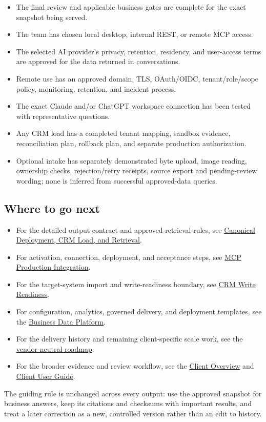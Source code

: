 \documentclass[
]{article}
\newcounter{none} %
\providecommand{\tightlist}{%
  \setlength{\itemsep}{0pt}\setlength{\parskip}{0pt}}
\begin{document}
\begin{itemize}
\tightlist
\item[$\square$]
  The final review and applicable business gates are complete for the
  exact snapshot being served.
\item[$\square$]
  The team has chosen local desktop, internal REST, or remote MCP
  access.
\item[$\square$]
  The selected AI provider's privacy, retention, residency, and
  user-access terms are approved for the data returned in conversations.
\item[$\square$]
  Remote use has an approved domain, TLS, OAuth/OIDC, tenant/role/scope
  policy, monitoring, retention, and incident process.
\item[$\square$]
  The exact Claude and/or ChatGPT workspace connection has been tested
  with representative questions.
\item[$\square$]
  Any CRM load has a completed tenant mapping, sandbox evidence,
  reconciliation plan, rollback plan, and separate production
  authorization.
\item[$\square$]
  Optional intake has separately demonstrated byte upload, image
  reading, ownership checks, rejection/retry receipts, source export and
  pending-review wording; none is inferred from successful approved-data
  queries.
\end{itemize}

\subsection{Where to go next}\label{where-to-go-next}

\begin{itemize}
\tightlist
\item
  For the detailed output contract and approved retrieval rules, see
  \href{../references/canonical-deployment-retrieval.md}{Canonical
  Deployment, CRM Load, and Retrieval}.
\item
  For activation, connection, deployment, and acceptance steps, see
  \href{../references/mcp-production-integration.md}{MCP Production
  Integration}.
\item
  For the target-system import and write-readiness boundary, see
  \href{../references/crm-write-readiness.md}{CRM Write Readiness}.
\item
  For configuration, analytics, governed delivery, and deployment
  templates, see the
  \href{../references/business-data-platform.md}{Business Data
  Platform}.
\item
  For the delivery history and remaining client-specific scale work, see
  the
  \href{../references/business-data-platform-roadmap.md}{vendor-neutral
  roadmap}.
\item
  For the broader evidence and review workflow, see the
  \href{CLIENT_OVERVIEW.md}{Client Overview} and
  \href{CLIENT_USER_GUIDE.md}{Client User Guide}.
\end{itemize}

The guiding rule is unchanged across every output: use the approved
snapshot for business answers, keep its citations and checksums with
important results, and treat a later correction as a new, controlled
version rather than an edit to history.
\end{document}
